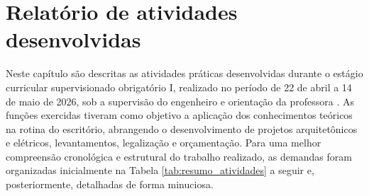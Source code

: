 \chapter[RELATÓRIO DE ATIVIDADES DESENVOLVIDAS]{Relatório de atividades desenvolvidas}

Neste capítulo são descritas as atividades práticas desenvolvidas durante o estágio curricular supervisionado obrigatório I, realizado no período de 22 de abril a 14 de maio de 2026, sob a supervisão do engenheiro \supervisordoestagio e orientação da professora \docenteestagio. As funções exercidas tiveram como objetivo a aplicação dos conhecimentos teóricos na rotina do escritório, abrangendo o desenvolvimento de projetos arquitetônicos e elétricos, levantamentos, legalização e orçamentação. Para uma melhor compreensão cronológica e estrutural do trabalho realizado, as demandas foram organizadas inicialmente na Tabela \ref{tab:resumo_atividades} a seguir e, posteriormente, detalhadas de forma minuciosa.



